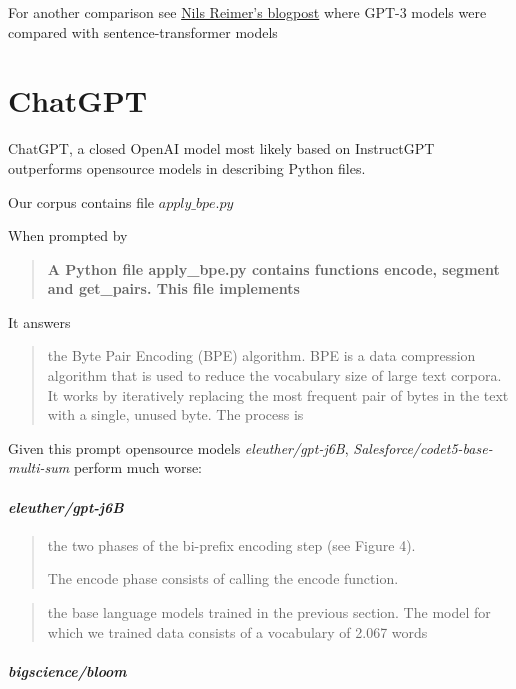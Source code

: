 \documentclass[longabstract,mgr,english]{iithesis}
\begin{document}
For another comparison see \href{https://medium.com/@nils_reimers/openai-gpt-3-text-embeddings-really-a-new-state-of-the-art-in-dense-text-embeddings-6571fe3ec9d9
}{Nils Reimer's blogpost} where GPT-3 models were compared with sentence-transformer models

\section{ChatGPT}

ChatGPT, a closed OpenAI model most likely based on InstructGPT\cite{instruct_gpt} outperforms opensource models in describing Python files.

Our corpus contains file $apply\_bpe.py$

When prompted by
\begin{quotation}
  \textbf{
    A Python file apply\_bpe.py contains functions encode, segment and get\_pairs. This file implements 
  }
\end{quotation}

It answers

\begin{quotation}
  the Byte Pair Encoding (BPE) algorithm.
BPE is a data compression algorithm that is used to reduce the vocabulary size of large text corpora. It works by iteratively replacing the most frequent pair of bytes in the text with a single, unused byte. The process is
\end{quotation}

Given this prompt opensource models \textit{eleuther/gpt-j6B}\cite{gpt-j},
\textit{Salesforce/codet5-base-multi-sum}\cite{bloom} perform much worse:

\paragraph{\textit{eleuther/gpt-j6B} }

\begin{quotation}
the two phases of the bi-prefix encoding step (see Figure 4).

The encode phase consists of calling the encode function.
\end{quotation}

\begin{quotation}
the base language models trained in the previous section. The model for which we trained data consists of a vocabulary of 2.067 words
\end{quotation}

\paragraph{\textit{bigscience/bloom}}
\end{document}
